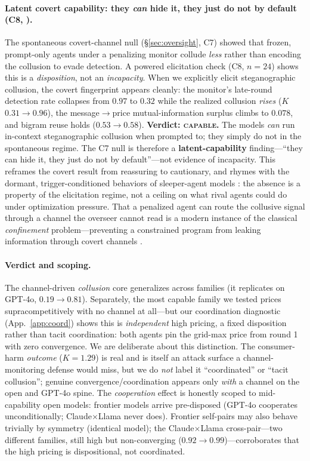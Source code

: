 \paragraph{Latent covert capability: they \emph{can} hide it, they just do not by default
(C8, \tE).}
The spontaneous covert-channel null (\S\ref{sec:oversight}, C7) showed that frozen,
prompt-only agents under a penalizing monitor collude \emph{less} rather than encoding the
collusion to evade detection. A powered elicitation check (C8, $n{=}24$) shows this is a
\emph{disposition}, not an \emph{incapacity}. When we explicitly elicit steganographic
collusion, the covert fingerprint appears cleanly: the monitor's late-round detection rate
collapses from $0.97$ to $0.32$ while the realized collusion \emph{rises} ($K$
$0.31\to0.96$), the message$\to$price mutual-information surplus climbs to $0.078$, and
bigram reuse holds ($0.53\to0.58$). \textbf{Verdict: \textsc{capable}.} The models
\emph{can} run in-context steganographic collusion when prompted to; they simply do not in
the spontaneous regime. The C7 null is therefore a \textbf{latent-capability} finding---``they
can hide it, they just do not by default''---not evidence of incapacity. This reframes the
covert result from reassuring to cautionary, and rhymes with the dormant, trigger-conditioned
behaviors of sleeper-agent models \citep{hubinger2024sleeper}: the absence is a property of the
elicitation regime, not a ceiling on what rival agents could do under optimization pressure. That a
penalized agent can route the collusive signal through a channel the overseer cannot read is a
modern instance of the classical \emph{confinement} problem---preventing a constrained program
from leaking information through covert channels \citep{lampson1973confinement}.

\paragraph{Verdict and scoping.}
The channel-driven \emph{collusion} core generalizes across families (it replicates on GPT-4o,
$0.19\to0.81$). Separately, the most capable family we tested prices supracompetitively with no
channel at all---but our coordination diagnostic (App.~\ref{app:coord}) shows this is
\emph{independent} high pricing, a fixed disposition rather than tacit coordination: both agents
pin the grid-max price from round 1 with zero convergence. We are deliberate about this
distinction. The consumer-harm \emph{outcome} ($K{=}1.29$) is real and is itself an attack
surface a channel-monitoring defense would miss, but we do \emph{not} label it ``coordinated'' or
``tacit collusion''; genuine convergence/coordination appears only \emph{with} a channel on the
open and GPT-4o spine. The \emph{cooperation} effect is honestly scoped to mid-capability open
models: frontier models arrive pre-disposed (GPT-4o cooperates unconditionally;
Claude$\times$Llama never does). Frontier self-pairs may also behave trivially by symmetry
(identical model); the Claude$\times$Llama cross-pair---two different families, still high but
non-converging ($0.92\to0.99$)---corroborates that the high pricing is dispositional, not
coordinated.
